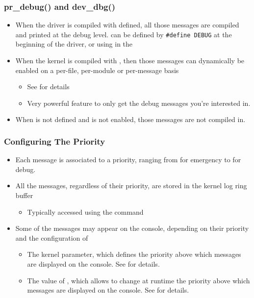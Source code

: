 \begin{frame}
  \frametitle{pr\_debug() and dev\_dbg()}
  \begin{itemize}
  \item When the driver is compiled with  defined, all
    those messages are compiled and printed at the debug level.
     can be defined by {\tt \#define DEBUG} at the
    beginning of the driver, or using
     in the 
  \item When the kernel is compiled with ,
    then those messages can dynamically be enabled on a per-file,
    per-module or per-message basis
    \begin{itemize}
    \item See  for details
    \item Very powerful feature to only get the debug messages you're
      interested in.
    \end{itemize}
  \item When  is not defined and
     is not enabled, those messages are not
    compiled in.
  \end{itemize}
\end{frame}

\begin{frame}
  \frametitle{Configuring The Priority}
  \begin{itemize}
  \item Each message is associated to a priority, ranging from  for
    emergency to  for debug.
  \item All the messages, regardless of their priority, are stored in
    the kernel log ring buffer
    \begin{itemize}
    \item Typically accessed using the  command
    \end{itemize}
  \item Some of the messages may appear on the console, depending on
    their priority and the configuration of
    \begin{itemize}
    \item The  kernel parameter, which defines the
      priority above which messages are displayed on the console. See
       for details.
    \item The value of , which allows to
      change at runtime the priority above which messages are
      displayed on the console. See
       for details.
    \end{itemize}
  \end{itemize}
\end{frame}

